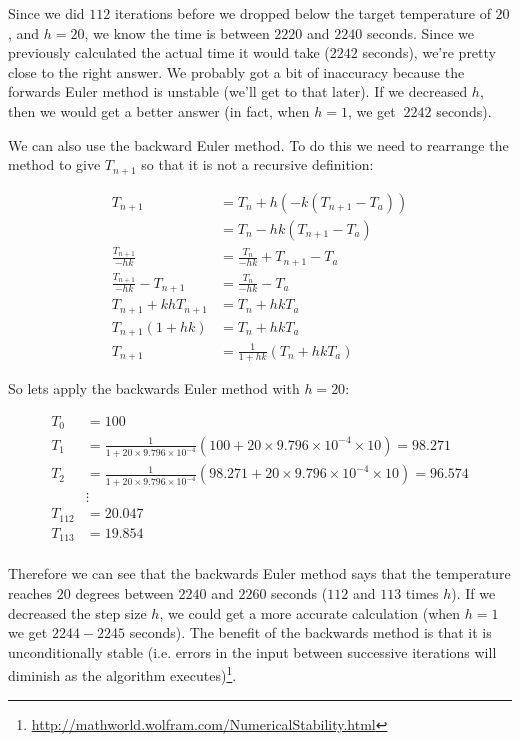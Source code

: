 Since we did $112$ iterations before we dropped below the target
temperature of $20$, and $h = 20$, we know the time is between $2220$
and $2240$ seconds. Since we previously calculated the actual time it
would take ($2242$ seconds), we're pretty close to the right
answer. We probably got a bit of inaccuracy because the forwards Euler
method is unstable (we'll get to that later). If we decreased $h$,
then we would get a better answer (in fact, when $h=1$, we get $~2242$
seconds).

We can also use the backward Euler method. To do this we need to
rearrange the method to give $T_{n+1}$ so that it is not a recursive
definition:

\[
\begin{split}
  T_{n+1} &= T_n + h(-k(T_{n+1} - T_a))\\
          &= T_n - hk(T_{n+1} - T_a)\\
  \frac{T_{n+1}}{-hk} &= \frac{T_n}{-hk} + T_{n+1} - T_a\\
  \frac{T_{n+1}}{-hk} - T_{n+1} &= \frac{T_n}{-hk} - T_a\\
  T_{n+1} + khT_{n+1} &= T_n + hkT_a\\
  T_{n+1}(1 + hk) &= T_n + hkT_a\\
  T_{n+1} &= \frac{1}{1 + hk}(T_n + hkT_a)
  \end{split}
\]

So lets apply the backwards Euler method with $h=20$:

\[
\begin{split}
  T_0 &= 100\\
  T_1 &= \frac{1}{1 + 20\times9.796\times10^{-4}}(100 +
  20\times9.796\times10^{-4}\times10) = 98.271\\
  T_2 &= \frac{1}{1 + 20\times9.796\times10^{-4}}(98.271 +
  20\times9.796\times10^{-4}\times10) = 96.574\\
  &\vdots\\
  T_{112} &= 20.047\\
  T_{113} &= 19.854\\
\end{split}
\]

Therefore we can see that the backwards Euler method says that the
temperature reaches $20$ degrees between $2240$ and $2260$ seconds
($112$ and $113$ times $h$). If we decreased the step size $h$, we
could get a more accurate calculation (when $h=1$ we get $2244-2245$
seconds). The benefit of the backwards method is that it is
unconditionally stable (i.e. errors in the input between successive
iterations will diminish as the algorithm
executes)\footnote{\url{http://mathworld.wolfram.com/NumericalStability.html}}.

